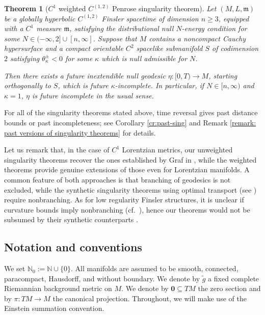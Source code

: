 \documentclass[a4paper,11pt]{article}
\numberwithin{equation}{section}
\theoremstyle{definition}
\theoremstyle{plain}
\newtheorem{Theorem}[Definition]{Theorem}
\newcommand{\N}{\mathbb N}
\begin{document}
\begin{Theorem}[$C^1$ weighted $C^{(1,2)}$ Penrose singularity theorem]
Let $(M,L,\mathfrak m)$ be a globally hyperbolic $C^{(1,2)}$ Finsler spacetime of dimension $n\geq3$, equipped with a $C^1$ measure  $\mathfrak m$, satisfying the distributional null $N$-energy condition for some $N\in(-\infty,2]\cup[n,\infty]$.
Suppose that $M$ contains a noncompact Cauchy hypersurface and a compact orientable $C^2$ spacelike submanifold $S$ of codimension $2$ satisfying $\theta_\kappa^\pm<0$ for some $\kappa$ which is null admissible for $N$. 

Then there exists a future inextendible null geodesic $\eta:[0,T)\to M$, starting orthogonally to $S$, which is future $\kappa$-incomplete.
In particular, if $N\in[n,\infty)$ and $\kappa=1$, $\eta$ is future incomplete in the usual sense.
\end{Theorem}

For all of the singularity theorems stated above, time reversal gives past distance bounds or past incompleteness; see Corollary \ref{cr:past-sing} and Remark \ref{remark: past versions of singularity theorems} for details.

Let us remark that, in the case of $C^1$ Lorentzian metrics, our unweighted singularity theorems recover the ones established by Graf in \cite{Graf-SingularityC1}, while the weighted theorems provide genuine extensions of those even for Lorentzian manifolds. 
A common feature of both approaches is that branching of geodesics is not excluded, while the synthetic singularity theorems using optimal transport (see \cite{CavallettiMondino, CavallettiManiniMondinosynthetic}) require nonbranching.
As for low regularity Finsler structures, it is unclear if curvature bounds imply nonbranching (cf.\ \cite{OhtaBranching, MagnaboscoCDbranching}), hence our theorems would not be subsumed by their synthetic counterparts \cite{CavallettiMondino, CavallettiManiniMondinosynthetic}.

\subsection{Notation and conventions}

We set $\N_0 :=\N \cup \{0\}$. 
All manifolds are assumed to be smooth, connected, paracompact, Hausdorff, and without boundary. 
We denote by $\tilde g$ a fixed complete Riemannian background metric on $M$. 
We denote by $\mathbf 0 \subseteq TM$ the zero section and by $\pi:TM \to M$ the canonical projection. 
Throughout, we will make use of the Einstein summation convention.
\end{document}
